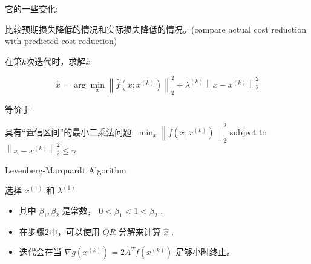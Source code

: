 它的一些变化:

\begin{example}
    比较预期损失降低的情况和实际损失降低的情况。(compare actual cost reduction with predicted cost reduction)
\end{example}

\begin{theorem}
    在第$k$次迭代时，求解$\hat{x}$

    \begin{equation}
    \hat{x}=\arg \min _{x}\left\|\hat{f}\left(x ; x^{(k)}\right)\right\|_{2}^{2}+\lambda^{(k)}\left\|x-x^{(k)}\right\|_{2}^{2}
    \end{equation}

    等价于

    具有“置信区间”的最小二乘法问题:
    $ \min _{x}\left\|\hat{f}\left(x ; x^{(k)}\right)\right\|_{2}^{2} $
    subject to $ \left\|x-x^{(k)}\right\|_{2}^{2} \leq \gamma $
\end{theorem}


\begin{algorithm}[htbp]
    \caption{Levenberg-Marquardt Algorithm}
    选择 $ x^{(1)} $ 和 $ \lambda^{(1)} $\;
\end{algorithm}

\begin{itemize}
    \item 其中 $ \beta_{1}, \beta_{2} $ 是常数， $ 0<\beta_{1}<1<\beta_{2} $ .
    \item 在步骤2中，可以使用 $ {QR} $ 分解来计算 $ \hat{x} $ .
    \item 迭代会在当 $ \nabla g\left(x^{(k)}\right)=2 A^{T} f\left(x^{(k)}\right) $ 足够小时终止。
\end{itemize}

